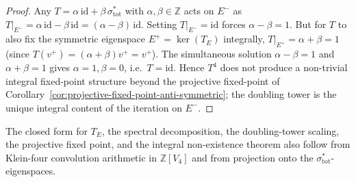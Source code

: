 \begin{proof}
Any $T = \alpha\,\mathrm{id} + \beta\,\sigma_{\mathrm{tot}}^*$ with
$\alpha, \beta \in \mathbb{Z}$ acts on $E^-$ as
$T\big|_{E^-} = \alpha\,\mathrm{id} - \beta\,\mathrm{id} = (\alpha - \beta)\,\mathrm{id}$.
Setting $T\big|_{E^-} = \mathrm{id}$ forces $\alpha - \beta = 1$. But for
$T$ to also fix the symmetric eigenspace $E^+ = \ker(T_E)$ integrally,
$T\big|_{E^+} = \alpha + \beta = 1$ \textup{(}since $T(v^+) = (\alpha + \beta) v^+
= v^+$\textup{).} The simultaneous solution $\alpha - \beta = 1$ and
$\alpha + \beta = 1$ gives $\alpha = 1, \beta = 0$, i.e.\
$T = \mathrm{id}$. Hence $T^4$ does not produce a non-trivial integral
fixed-point structure beyond the projective fixed-point of
Corollary~\ref{cor:projective-fixed-point-anti-symmetric}; the doubling
tower is the unique integral content of the iteration on $E^-$.
\end{proof}
The closed form for \(T_E\), the spectral decomposition, the
doubling-tower scaling, the projective fixed point, and the integral
non-existence theorem also follow from Klein-four convolution arithmetic
in \(\mathbb Z[V_4]\) and from projection onto the
\(\sigma_{\mathrm{tot}}^*\)-eigenspaces.


